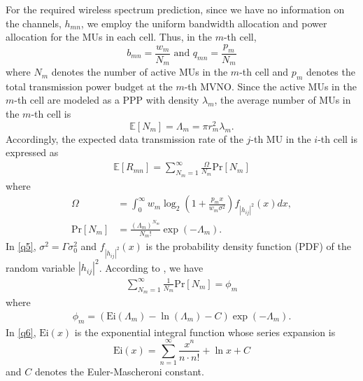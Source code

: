 \documentclass[journal]{IEEEtran}
\begin{document}
For the required wireless spectrum prediction, since we have no information on the channels, $h_{mn}$, we employ the uniform bandwidth allocation and power allocation for the MUs in each cell. Thus, in the $m$-th cell,
\begin{equation}
b_{mn} = \frac{w_m}{N_m} \mbox{ and }q_{mn}=\frac{p_m}{N_m}
\end{equation}
where $N_m$ denotes the number of active MUs in the $m$-th cell and $p_m$ denotes the total transmission power budget at the $m$-th MVNO. Since the active MUs in the $m$-th cell are modeled as a PPP with density $\lambda_m$, the average number of MUs in the $m$-th cell is
\begin{equation}
\mathbb{E}[N_m]=\Lambda_m=\pi r_m^2 \lambda_m.
\end{equation}
Accordingly, the expected data transmission rate of the $j$-th MU in the $i$-th cell is expressed as
\begin{align}
\mathbb{E}\left[{R}_{mn}\right] = \sum_{N_m=1}^{\infty}\frac{\Omega}{N_m}\mbox{Pr}[N_m]
\end{align}
where
\begin{align}
\label{q5}\Omega&=\int_{0}^{\infty} w_m\log_2\left(1 + \frac{p_m x}{w_m \sigma^2}\right) f_{\left|h_{ij} \right|^2} \left(x\right)dx,\\
\mbox{Pr}[N_m]&=\frac{(\Lambda_m)^{N_m}}{N_m!}\exp\left(-\Lambda_m\right).
\end{align}
In \eqref{q5}, $\sigma^2=\Gamma \sigma_0^2$ and $f_{\left|h_{ij} \right|^2} \left(x\right)$ is the probability density function (PDF) of the random variable $\left|h_{ij} \right|^2$. According to \cite{MAbramowitz}, we have
\begin{align}
\sum_{N_m=1}^{\infty}\frac{1}{N_m}\mbox{Pr}[N_m]=\phi_m
\end{align}
where
\begin{align}\label{q6}
\phi_m= \left(\mbox{Ei}\left(\Lambda_m\right) - \ln\left(\Lambda_m\right)- C\right)\exp\left(-\Lambda_m\right).
\end{align}
In \eqref{q6}, $\mbox{Ei}\left(x\right)$ is the exponential integral function whose series expansion is \cite[5.1.10]{MAbramowitz}
\begin{equation}
\mbox{Ei}\left(x\right) =\sum\limits_{n = 1}^{\infty}\frac{x^n}{n\cdot n!}+\ln x+C
\end{equation}
and $C$ denotes the Euler-Mascheroni constant.
\end{document}
